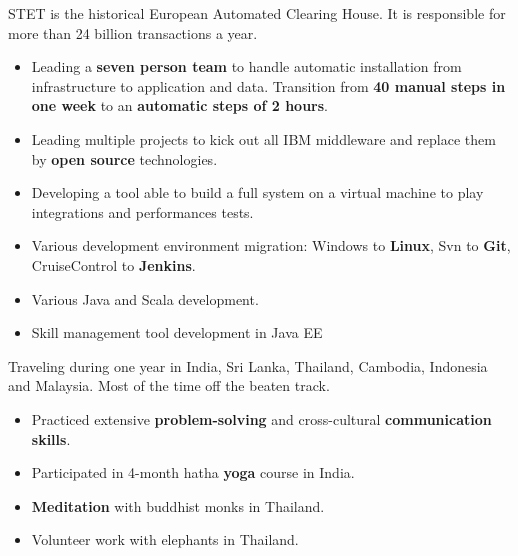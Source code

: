\documentclass[10pt,a4paper,ragged2e]{altacv}
\begin{document}
	
		STET is the historical European Automated Clearing House. It is responsible for more than 24 billion transactions a year.
	
		\medskip
		\begin{itemize}
			\item Leading a \textbf{seven person team} to handle automatic installation from infrastructure to application and data. Transition from \textbf{40 manual steps in one week} to an \textbf{automatic steps of 2 hours}.
			\item Leading multiple projects to kick out all IBM middleware and replace them by\textbf{ open source} technologies.
			\item Developing a tool able to build a full system on a virtual machine to play integrations and performances tests.
		\end{itemize}
	\divider

		\begin{itemize}
			\item Various development environment migration: Windows to \textbf{Linux}, Svn to \textbf{Git}, CruiseControl to \textbf{Jenkins}.
			\item Various Java and Scala development.
		\end{itemize}
	\divider

		\begin{itemize}
			\item Skill management tool development in Java EE
		\end{itemize}

\bigskip
{}
	
		Traveling during one year in India, Sri Lanka, Thailand, Cambodia, Indonesia and Malaysia. Most of the time off the beaten track. 
		
		\medskip
		\begin{itemize}
			\item Practiced extensive \textbf{problem-solving} and cross-cultural \textbf{communication skills}.
			\item Participated in 4-month hatha \textbf{yoga} course in India.
			\item \textbf{Meditation} with buddhist monks in Thailand.
			\item Volunteer work with elephants in Thailand.
		\end{itemize}
\end{document}
